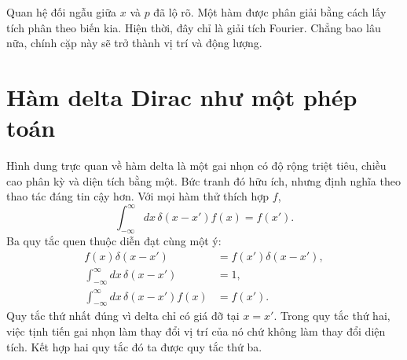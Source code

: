 \begin{classroomqa}
\end{classroomqa}

\begin{classroomqa}
\end{classroomqa}

Quan hệ đối ngẫu giữa \(x\) và \(p\) đã lộ rõ. Một hàm được phân giải bằng cách lấy tích phân theo biến kia. Hiện thời, đây chỉ là giải tích Fourier. Chẳng bao lâu nữa, chính cặp này sẽ trở thành vị trí và động lượng.

\section{Hàm delta Dirac như một phép toán}

Hình dung trực quan về hàm delta là một gai nhọn có độ rộng triệt tiêu, chiều cao phân kỳ và diện tích bằng một. Bức tranh đó hữu ích, nhưng định nghĩa theo thao tác đáng tin cậy hơn. Với mọi hàm thử thích hợp \(f\),
\begin{equation}
\int_{-\infty}^{\infty}
dx\,\delta(x-x')f(x)
=f(x').
\label{eq:l9-delta-sampling}
\end{equation}
Ba quy tắc quen thuộc diễn đạt cùng một ý:
\begin{align}
f(x)\delta(x-x')
&=
f(x')\delta(x-x'),
\label{eq:l9-delta-multiplication}\\
\int_{-\infty}^{\infty}dx\,\delta(x-x')
&=1,
\label{eq:l9-delta-area}\\
\int_{-\infty}^{\infty}dx\,\delta(x-x')f(x)
&=f(x').
\end{align}
Quy tắc thứ nhất đúng vì delta chỉ có giá đỡ tại \(x=x'\). Trong quy tắc thứ hai, việc tịnh tiến gai nhọn làm thay đổi vị trí của nó chứ không làm thay đổi diện tích. Kết hợp hai quy tắc đó ta được quy tắc thứ ba.


